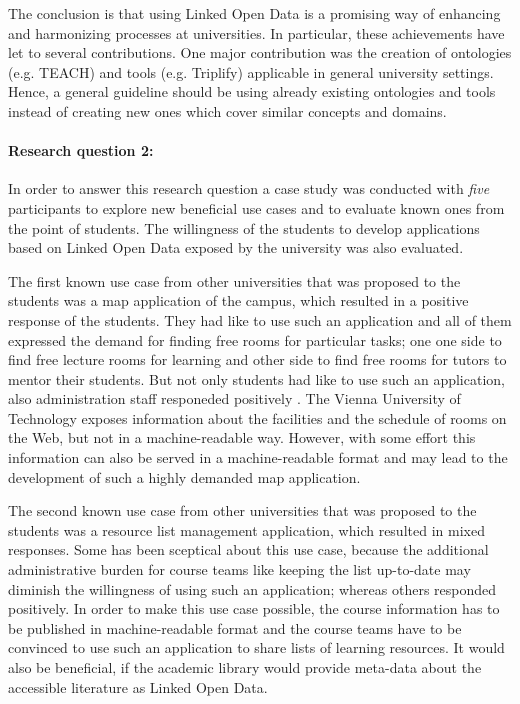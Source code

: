 \documentclass{article}
\begin{document}
The conclusion is that using Linked Open Data is a promising way of enhancing and harmonizing processes at universities. In particular, these achievements have let to several contributions. One major contribution was the creation of ontologies (e.g. TEACH) and tools (e.g. Triplify) applicable in general university settings. 
Hence, a general guideline should be using already existing ontologies and tools instead of creating new ones which cover similar concepts and domains.

\paragraph{Research question 2:} In order to answer this research question a case study was conducted with \textit{five} participants to explore new beneficial use cases and to evaluate known ones from the point of students. The willingness of the students to develop applications based on Linked Open Data exposed by the university was also evaluated.

The first known use case from other universities that was proposed to the students was a map application of the campus, which resulted in a positive response of the students. They had like to use such an application and all  of them expressed the demand for finding free rooms for particular tasks; one one side to find free lecture rooms for learning and other side to find free rooms for tutors to mentor their students. But not only students had like to use such an application, also administration staff responeded positively \cite{gamerith_linked_2016}. The Vienna University of Technology exposes information about the facilities and the schedule of rooms on the Web, but not in a machine-readable way. However, with some effort this information can also be served in a machine-readable format and may lead to the development of such a highly demanded map application.

The second known use case from other universities that was proposed to the students was a resource list management application, which resulted in mixed responses. Some has been sceptical about this use case, because the additional administrative burden for course teams like keeping the list up-to-date may diminish the willingness of using such an application; whereas others responded positively. In order to make this use case possible, the course information has to be published in machine-readable format and the course teams have to be convinced to use such an application to share lists of learning resources. It would also be beneficial, if the academic library would provide meta-data about the accessible literature as Linked Open Data.
\end{document}
